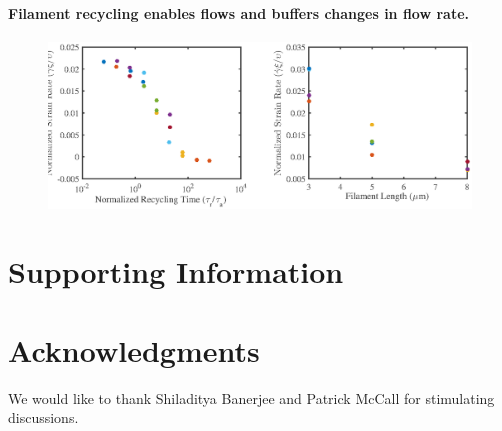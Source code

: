 \documentclass[10pt,letterpaper]{article}
\begin{document}
\paragraph{Filament recycling enables flows and buffers changes in flow rate.}

\begin{figure}[h!]
\centering
\includegraphics[width=\hsize]{figures/figure6b}
\caption{\label{fig:flow_form}  }
\end{figure}

\section*{Supporting Information}


\section*{Acknowledgments}
We would like to thank Shiladitya Banerjee and Patrick McCall for stimulating discussions.

\nolinenumbers

%
%
% 

\end{document}
